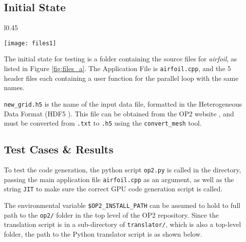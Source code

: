 \subsection{Initial State}
\begin{wrapfigure}[13]{l}{0.45\textwidth}
  \centering
\caption{\textit{airfoil} folder initial state}
\label{fig:files_a}
\texttt{[image: files1]}
\end{wrapfigure}
The initial state for testing is a folder containing the source files for \textit{airfoil}, as listed in Figure \ref{fig:files_a}. The Application File is \verb|airfoil.cpp|, and the 5 header files each containing a user function for the parallel loop with the same names.
\par
\noindent\verb|new_grid.h5| is the name of the input data file, formatted in the Heterogeneous Data Format (HDF5 \cite{HDF5}). This file can be obtained from the OP2 website \cite{op-dsl}, and must be converted from \verb|.txt| to \verb|.h5| using the \verb|convert_mesh| tool.

\clearpage
\subsection{Test Cases \& Results}
\label{ss:results}

\hspace{\parindent}
To test the code generation, the python script \verb|op2.py| is called in the directory, passing the main application file \verb|airfoil.cpp| as an argument, as well as the string \verb|JIT| to make sure the correct GPU code generation script is called. \par
The environmental variable \verb|$OP2_INSTALL_PATH| can be assumed to hold to full path to the \verb|op2/| folder in the top level of the OP2 repository. Since the translation script is in a sub-directory of \verb|translator/|, which is also a top-level folder, the path to the Python translator script is as shown below.

